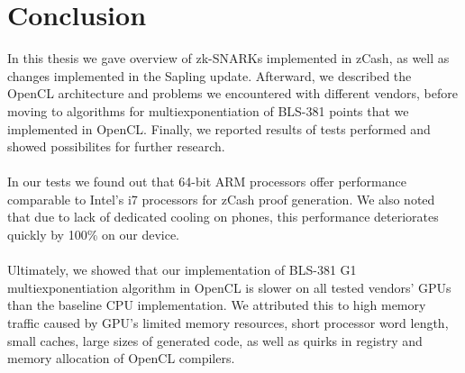 
\chapter{Conclusion} %

\label{Chapter9} %


In this thesis we gave overview of zk-SNARKs implemented in zCash, as well as changes implemented in the Sapling update. Afterward, we described the OpenCL architecture and problems we encountered with different vendors, before moving to algorithms for multiexponentiation of BLS-381 points that we implemented in OpenCL. Finally, we reported results of tests performed and showed possibilites for further research.\\
\\
In our tests we found out that 64-bit ARM processors offer performance comparable to Intel's i7 processors for zCash proof generation. We also noted that due to lack of dedicated cooling on phones, this performance deteriorates quickly by 100\% on our device.\\
\\
Ultimately, we showed that our implementation of BLS-381 G1 multiexponentiation algorithm in OpenCL is slower on all tested vendors' GPUs than the baseline CPU implementation. We attributed this to high memory traffic caused by GPU's limited memory resources, short processor word length, small caches, large sizes of generated code, as well as quirks in registry and memory allocation of OpenCL compilers.